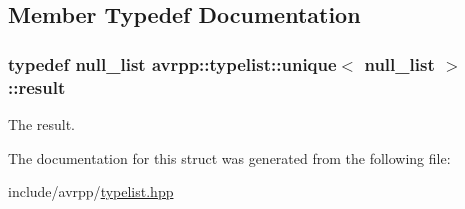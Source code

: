 \subsection{Member Typedef Documentation}
\hypertarget{structavrpp_1_1typelist_1_1unique_3_01null__list_01_4_a79de2551810ea8d4d107ae62bf4428ab}{
\subsubsection[{result}]{\setlength{\rightskip}{0pt plus 5cm}typedef {\bf null\_\-list} {\bf avrpp::typelist::unique}$<$ {\bf null\_\-list} $>$::{\bf result}}}
\label{structavrpp_1_1typelist_1_1unique_3_01null__list_01_4_a79de2551810ea8d4d107ae62bf4428ab}


The result. 



The documentation for this struct was generated from the following file:\begin{DoxyCompactItemize}
\item 
include/avrpp/\hyperlink{typelist_8hpp}{typelist.hpp}\end{DoxyCompactItemize}
